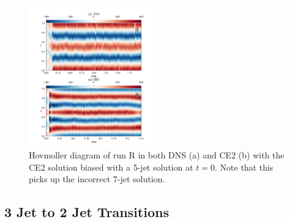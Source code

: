 \documentclass{jfm}
\begin{document}
\begin{figure}
  \centering
  \includegraphics[width=0.5\textwidth]{../../figs/hov_cu_dns_ce2_run_T.pdf}
  \caption{Hovmoller diagram of run R in both DNS (a) and CE2 (b) with the CE2 solution biased with a 5-jet solution at $t=0$. Note that this picks up the incorrect 7-jet solution.}
  \label{fig:hov_run_T}
\end{figure}

\subsection{3 Jet to 2 Jet Transitions}
\label{sec:3->2}
\end{document}

